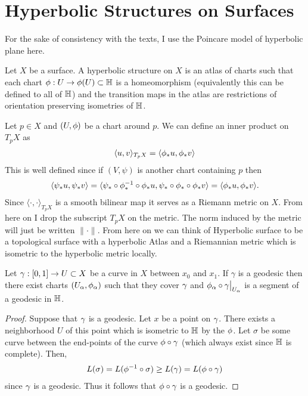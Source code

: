 \section{Hyperbolic Structures on Surfaces}
For the sake of consistency with the texts, I use the Poincare model of hyperbolic plane here.
\begin{definition}
  Let $X$ be a surface. A hyperbolic structure on $X$ is an atlas of charts such that each chart $\phi:U\to \phi(U)\subset \mathbb{H}$ is a homeomorphism (equivalently this can be defined to all of $\mathbb{H}$) and the transition maps in the atlas are restrictions of orientation preserving isometries of $\mathbb{H}$.
\end{definition}

Let $p\in X$ and $(U,\phi)$ be a chart around $p$. We can define an inner product on $T_p X$ as
\begin{align*}
  \langle u,v \rangle_{T_pX} = \langle \phi_* u, \phi_* v \rangle  
\end{align*}
This is well defined since if $(V,\psi)$ is another chart containing $p$ then
\begin{align*}
  \langle \psi_* u, \psi_* v \rangle = \langle \psi_*\circ \phi_*^{-1}\circ \phi_* u, \psi_*\circ\phi_*\circ \phi_* v \rangle = \langle \phi_* u, \phi_* v \rangle.
\end{align*}
Since $\langle \cdot, \cdot \rangle_{T_pX}$ is a smooth bilinear map it serves as a Riemann metric on $X$. From here on I drop the subscript $T_pX$ on the metric. The norm induced by the metric will just be written $\|\cdot\|$. From here on we can think of Hyperbolic surface to be a topological surface with a hyperbolic Atlas and a Riemannian metric which is isometric to the hyperbolic metric locally.
\begin{proposition}
  Let $\gamma:[0,1] \to U\subset X$ be a curve in $X$ between $x_0$ and $x_1$. If $\gamma$ is a geodesic then there exist charts $(U_\alpha,\phi_\alpha)$ such that they cover $\gamma$ and $\phi_\alpha\circ \gamma\big|_{U_\alpha}$ is a segment of a geodesic in $\mathbb{H}$. 
\end{proposition}
\begin{proof}
  Suppose that $\gamma$ is a geodesic. Let $x$ be a point on $\gamma$. There exists a neighborhood $U$ of this point which is isometric to $\mathbb{H}$ by the $\phi$. Let $\sigma$ be some curve between the end-points of the curve $\phi\circ \gamma$ (which always exist since $\mathbb{H}$ is complete). Then,
  \begin{align*}
    L(\sigma) = L(\phi^{-1}\circ \sigma) \geq L(\gamma) = L(\phi\circ\gamma)
  \end{align*}
  since $\gamma$ is a geodesic. Thus it follows that $\phi\circ \gamma$ is a geodesic.
\end{proof}

